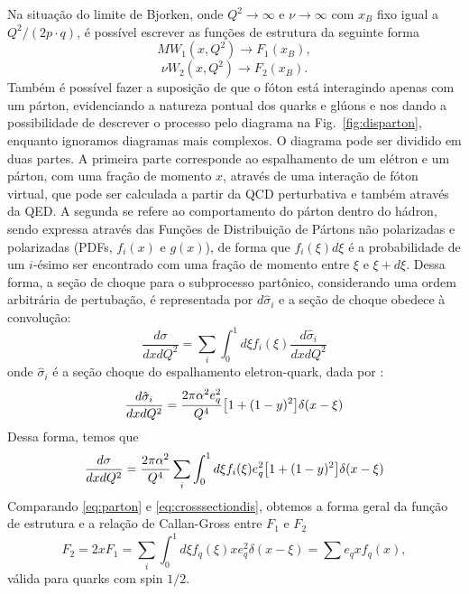 Na situação do limite de Bjorken, onde \( Q^2 \rightarrow \infty \) e \( \nu \rightarrow \infty \) com \( x_B \) fixo igual a \( Q^2/(2p \cdot q) \), é possível escrever as funções de estrutura da seguinte forma
\begin{equation}
    MW_1 (x, Q^2)\rightarrow F_1(x_B),
\end{equation}
\begin{equation}
    \nu W_2(x, Q^2) \rightarrow F_2(x_B).
\end{equation}
Também é possível fazer a suposição de que o fóton está interagindo apenas com um párton, evidenciando a natureza pontual dos quarks e glúons e nos dando a possibilidade de descrever o processo pelo diagrama na Fig.~\ref{fig:disparton}, enquanto ignoramos diagramas mais complexos. O diagrama pode ser dividido em duas partes. A primeira parte corresponde ao espalhamento de um elétron e um párton, com uma fração de momento \( x \), através  de uma interação de fóton virtual, que pode ser calculada a partir da  QCD perturbativa e também através da QED. A segunda se refere ao comportamento do párton dentro do hádron, sendo expressa através das Funções de Distribuição de Pártons não polarizadas e polarizadas (PDFs, \( f_i(x) \) e \( g(x) \)), de forma que  $f_i(\xi) d\xi$ é a probabilidade de um $i$-ésimo ser encontrado com uma fração de momento entre $\xi$ e $\xi + d\xi$. Dessa forma, a seção de choque para o subprocesso partônico, considerando uma ordem arbitrária de pertubação, é representada por $d\hat{\sigma}_i$  e a seção de choque obedece à convolução:
\begin{equation}
    \frac{d\sigma}{dxdQ^2}  = \sum_i \int^{1}_{0} d\xi f_i(\xi) \frac{d\hat{\sigma}_i}{dxdQ^2}
\end{equation}
onde $\hat{\sigma}_i$ é a seção choque do espalhamento eletron-quark, dada por :
\begin{equation}
    \frac{d\hat{\sigma}_i}{dxdQ^2}  = \frac{2\pi\alpha^2e_q^2}{Q^4}\qty[1 + (1-y)^2]\delta(x-\xi)
\end{equation}
Dessa forma, temos que
\begin{equation}
    \frac{d\sigma}{dxdQ^2}  = \frac{2\pi\alpha^2}{Q^4}\sum_i \int^{1}_{0} d\xi f_i(\xi) e_q^2  \qty[1 + (1-y)^2]\delta(x-\xi)
    \label{eq:parton}
\end{equation}
Comparando \eqref{eq:parton} e \eqref{eq:crosssectiondis}, obtemos a forma geral da função de estrutura e a relação de Callan-Gross entre $F_1$ e $F_2$
\begin{equation}
    F_2 = 2xF_1 = \sum_i \int^1_0 d\xi f_q(\xi) x e_q^2 \delta(x-\xi) = \sum e_q x f_q(x),
    \label{eq:funcaoestruturapdfs}
\end{equation}
válida para quarks com spin $1/2$.

